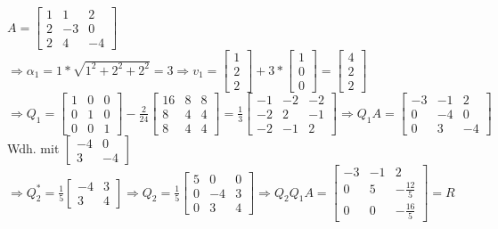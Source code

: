 \documentclass[10pt,a4paper]{article}
\begin{document}
	\begin{center}
		$A = \begin{bmatrix}1 & 1 & 2\\2 & -3 & 0 \\2 & 4 & -4\end{bmatrix}$\\\vspace*{0.5cm}
		$\Rightarrow \alpha_1 = 1 * \sqrt{1^2 + 2^2 + 2^2} = 3 \Rightarrow v_1 = \begin{bmatrix} 1 \\ 2 \\ 2\end{bmatrix} + 3 * \begin{bmatrix}1 \\ 0 \\ 0\end{bmatrix} = \begin{bmatrix} 4 \\ 2 \\ 2\end{bmatrix}$\\
		$\Rightarrow Q_1 = \begin{bmatrix}1 & 0 & 0 \\ 0 & 1 & 0 \\ 0 & 0 & 1\end{bmatrix} - \frac{2}{24} \begin{bmatrix}16 & 8 & 8 \\ 8 & 4 & 4\\ 8 & 4 & 4\end{bmatrix} = \frac{1}{3} \begin{bmatrix}-1 & -2 & -2 \\ -2 & 2 & -1 \\ -2 & -1 & 2\end{bmatrix}
		\Rightarrow Q_1A = \begin{bmatrix}-3 & -1 & 2 \\ 0 & -4 & 0 \\ 0 & 3 & -4\end{bmatrix}$\\\vspace*{0.5cm}
		Wdh. mit $\begin{bmatrix}-4 & 0 \\ 3 & -4\end{bmatrix}$\\
		$\Rightarrow Q_2^* = \frac{1}{5}\begin{bmatrix}-4 & 3 \\ 3 & 4\end{bmatrix} \Rightarrow Q_2 = \frac{1}{5}\begin{bmatrix}5 & 0 & 0\\0 & -4 & 3\\0 & 3 & 4\end{bmatrix} \Rightarrow Q_2Q_1A = \begin{bmatrix}-3 & -1 & 2 \\ 0 & 5 & -\frac{12}{5} \\ 0 & 0 & -\frac{16}{5}\end{bmatrix} = R$\\\vspace*{0.5cm}

\end{center}
\end{document}

